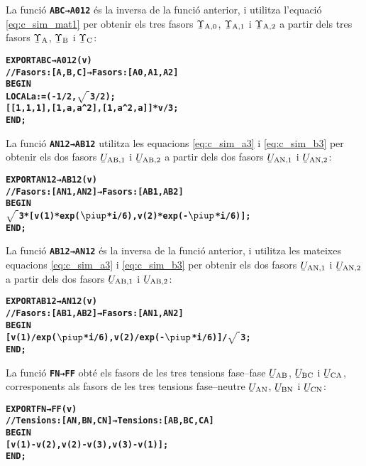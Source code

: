 La funció \texttt{\textbf{ABC→A012}} és la inversa de la funció anterior, i utilitza l'equació \eqref{eq:c_sim_mat1} per obtenir els tres fasors
$\cmplx{\Upsilon}\ped{A,0}$, $\cmplx{\Upsilon}\ped{A,1}$ i  $\cmplx{\Upsilon}\ped{A,2}$ a partir dels tres fasors $\cmplx{\Upsilon}\ped{A}$, $\cmplx{\Upsilon}\ped{B}$ i $\cmplx{\Upsilon}\ped{C}$:
\vspace{-6mm}
\begin{alltt}
\bfseries
    EXPORT ABC→A012(v)
    // Fasors:[A,B,C] → Fasors:[A0,A1,A2]
    BEGIN
      LOCAL a:=(-1/2,\(\sqrt{\phantom{|}}\)3/2);
      [[1,1,1],[1,a,a^2],[1,a^2,a]]*v/3;
    END;
\end{alltt}

La funció \texttt{\textbf{AN12→AB12}} utilitza les equacions  \eqref{eq:c_sim_a3} i \eqref{eq:c_sim_b3} per obtenir els dos fasors $\cmplx{U}\ped{AB,1}$ i  $\cmplx{U}\ped{AB,2}$ a partir dels dos fasors $\cmplx{U}\ped{AN,1}$ i $\cmplx{U}\ped{AN,2}$:
\vspace{-6mm}
\begin{alltt}
\bfseries
    EXPORT AN12→AB12(v)
    // Fasors:[AN1,AN2] → Fasors:[AB1,AB2]
    BEGIN
      \(\sqrt{\phantom{|}}\)3*[v(1)*exp(\(\piup\)*i/6),v(2)*exp(-\(\piup\)*i/6)];
    END;
\end{alltt}

La funció \texttt{\textbf{AB12→AN12}} és la inversa de la funció anterior, i utilitza les mateixes equacions  \eqref{eq:c_sim_a3} i \eqref{eq:c_sim_b3} per obtenir els dos fasors $\cmplx{U}\ped{AN,1}$ i $\cmplx{U}\ped{AN,2}$ a partir dels dos fasors $\cmplx{U}\ped{AB,1}$ i  $\cmplx{U}\ped{AB,2}$:
\vspace{-6mm}
\begin{alltt}
\bfseries
    EXPORT AB12→AN12(v)
    // Fasors:[AB1,AB2] → Fasors:[AN1,AN2]
    BEGIN
      [v(1)/exp(\(\piup\)*i/6),v(2)/exp(-\(\piup\)*i/6)]/\(\sqrt{\phantom{|}}\)3;
    END;
\end{alltt}

La funció \texttt{\textbf{FN→FF}} obté els fasors de les tres tensions fase--fase $\cmplx{U}\ped{AB}$, $\cmplx{U}\ped{BC}$ i $\cmplx{U}\ped{CA}$, corresponents als fasors de les tres tensions fase--neutre
$\cmplx{U}\ped{AN}$, $\cmplx{U}\ped{BN}$ i $\cmplx{U}\ped{CN}$:
\vspace{-6mm}
\begin{alltt}
\bfseries
    EXPORT FN→FF(v)
    // Tensions:[AN,BN,CN] → Tensions:[AB,BC,CA]
    BEGIN
      [v(1)-v(2),v(2)-v(3),v(3)-v(1)];
    END;
\end{alltt}


